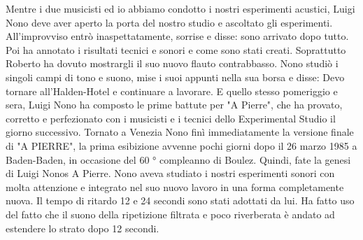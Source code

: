Mentre i due musicisti ed io abbiamo condotto i nostri esperimenti acustici, Luigi Nono deve aver aperto la porta del nostro studio e ascoltato gli esperimenti. All'improvviso entrò inaspettatamente, sorrise e disse: sono arrivato dopo tutto.
Poi ha annotato i risultati tecnici e sonori e come sono stati creati. Soprattutto Roberto ha dovuto mostrargli il suo nuovo flauto contrabbasso. Nono studiò i singoli campi di tono e suono, mise i suoi appunti nella sua borsa e disse: Devo tornare all'Halden-Hotel e continuare a lavorare. E quello stesso pomeriggio e sera, Luigi Nono ha composto le prime battute per "A Pierre", che ha provato, corretto e perfezionato con i musicisti e i tecnici dello Experimental Studio il giorno successivo.
Tornato a Venezia Nono finì immediatamente la versione finale di "A PIERRE", la prima esibizione avvenne pochi giorni dopo il 26 marzo 1985 a Baden-Baden, in occasione del 60 ° compleanno di Boulez.
Quindi, fate la genesi di Luigi Nonos A Pierre. Nono aveva studiato i nostri esperimenti sonori con molta attenzione e integrato nel suo nuovo lavoro in una forma completamente nuova. Il tempo di ritardo 12 e 24 secondi sono stati adottati da lui. Ha fatto uso del fatto che il suono della ripetizione filtrata e poco riverberata è andato ad estendere lo strato dopo 12 secondi.

